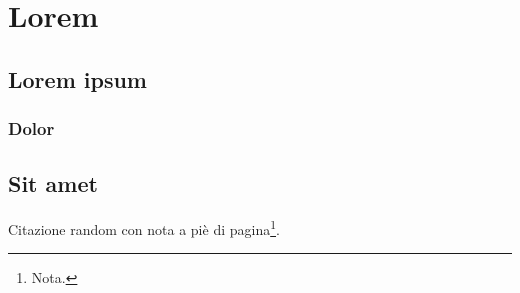 \chapter{Lorem}
\lipsum[1]
\section{Lorem ipsum}
\lipsum[2-4]
\subsection{Dolor}
\lipsum[5]
\section{Sit amet}
\lipsum[6-8]
Citazione random \cite{lamport82} con nota a piè di pagina\footnote{Nota.}.\par
\lipsum[9]
\clearpage{\pagestyle{plain}\cleardoublepage} %